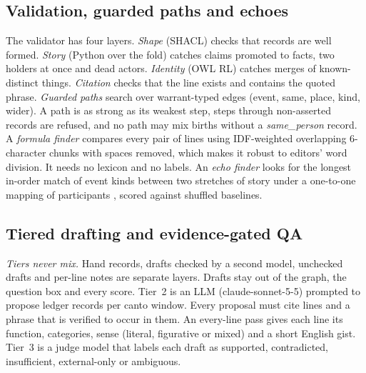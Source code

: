 \documentclass[11pt]{article}
\begin{document}
\subsection{Validation, guarded paths and echoes}
\label{sec:paths-method}
The validator has four layers. \emph{Shape} (SHACL) checks that records are well formed. \emph{Story} (Python over the fold) catches claims promoted to facts, two holders at once and dead actors. \emph{Identity} (OWL RL) catches merges of known-distinct things. \emph{Citation} checks that the line exists and contains the quoted phrase. \emph{Guarded paths} search over warrant-typed edges (event, same, place, kind, wider). A path is as strong as its weakest step, steps through non-asserted records are refused, and no path may mix births without a \emph{same\_person} record. A \emph{formula finder} compares every pair of lines using IDF-weighted overlapping 6-character chunks with spaces removed, which makes it robust to editors' word division. It needs no lexicon and no labels. An \emph{echo finder} looks for the longest in-order match of event kinds between two stretches of story under a one-to-one mapping of participants \citep{Falkenhainer1989Sme}, scored against shuffled baselines.

\subsection{Tiered drafting and evidence-gated QA}
\label{sec:qa-method}
\emph{Tiers never mix.} Hand records, drafts checked by a second model, unchecked drafts and per-line notes are separate layers. Drafts stay out of the graph, the question box and every score. Tier~2 is an LLM (claude-sonnet-5-5) prompted to propose ledger records per canto window. Every proposal must cite lines and a phrase that is verified to occur in them. An every-line pass gives each line its function, categories, sense (literal, figurative or mixed) and a short English gist. Tier~3 is a judge model that labels each draft as supported, contradicted, insufficient, external-only or ambiguous.
\end{document}
